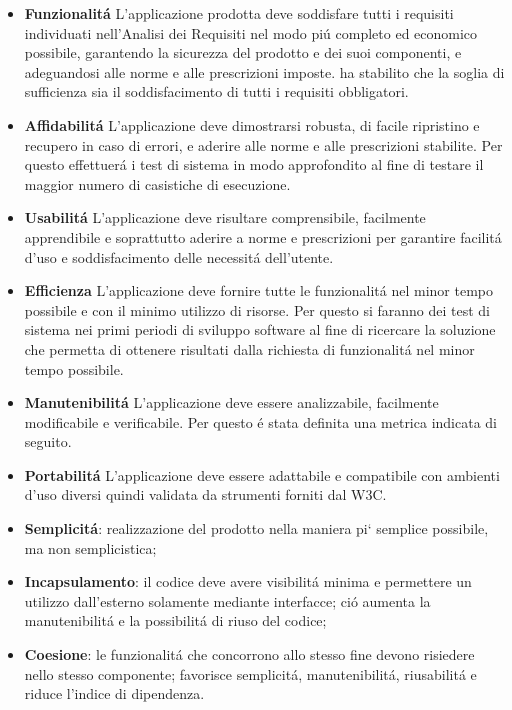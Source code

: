 \begin{itemize}
\item \textbf{Funzionalit\'a}
L’applicazione prodotta deve soddisfare tutti i requisiti individuati nell’Analisi dei Requisiti nel modo pi\'u completo ed economico possibile, garantendo la sicurezza del prodotto e dei suoi componenti, e adeguandosi alle norme e alle prescrizioni imposte.
\gruppo ha stabilito che la soglia di sufficienza sia il soddisfacimento di tutti i requisiti obbligatori.
\item \textbf{Affidabilit\'a}
L’applicazione deve dimostrarsi robusta, di facile ripristino e recupero in caso di errori, e aderire alle norme e alle prescrizioni stabilite.
Per questo \gruppo effettuer\'a i test di sistema in modo approfondito al fine di testare il maggior numero di casistiche di esecuzione.
\item \textbf{Usabilit\'a}
L’applicazione deve risultare comprensibile, facilmente apprendibile e soprattutto aderire a norme e prescrizioni per garantire facilit\'a d’uso e soddisfacimento delle necessit\'a dell’utente.
\item \textbf{Efficienza}
L’applicazione deve fornire tutte le funzionalit\'a nel minor tempo possibile e con il minimo utilizzo di risorse.
Per questo si faranno dei test di sistema nei primi periodi di sviluppo software al fine di ricercare la soluzione che permetta di ottenere risultati dalla richiesta di funzionalit\'a nel minor tempo possibile.
\item \textbf{Manutenibilit\'a}
L’applicazione deve essere analizzabile, facilmente modificabile e verificabile. Per questo \'e stata definita una metrica indicata di seguito.
\item \textbf{Portabilit\'a}
L’applicazione deve essere adattabile e compatibile con ambienti d’uso diversi quindi validata da strumenti forniti dal W3C.
\item \textbf{Semplicit\'a}: realizzazione del prodotto nella maniera pi` semplice possibile, ma non semplicistica;
\item \textbf{Incapsulamento}: il codice deve avere visibilit\'a minima e permettere un utilizzo dall’esterno solamente mediante interfacce; ci\'o aumenta la manutenibilit\'a e la possibilit\'a di riuso del codice;
\item \textbf{Coesione}: le funzionalit\'a che concorrono allo stesso fine devono risiedere nello stesso componente; favorisce semplicit\'a, manutenibilit\'a, riusabilit\'a e riduce l’indice di dipendenza.
\end{itemize}
